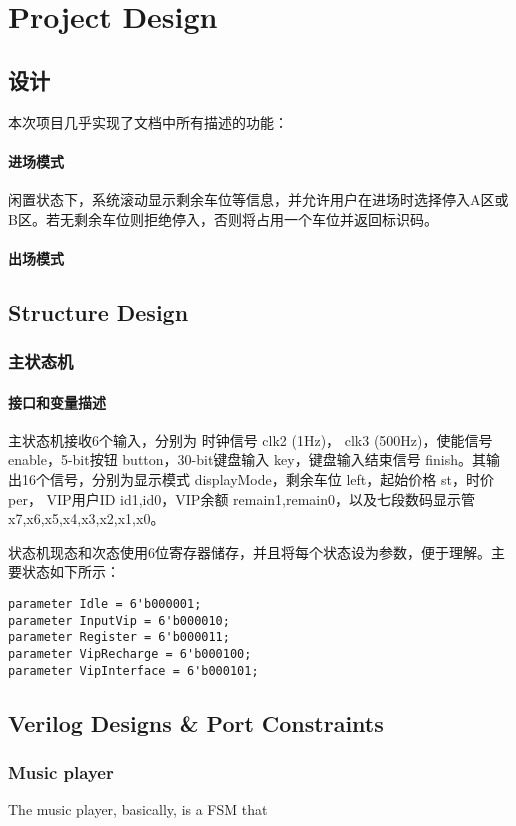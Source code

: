 \section{Project Design}

\subsection{设计}
本次项目几乎实现了文档中所有描述的功能：
\vspace{-1.3em}
\paragraph{ 进场模式} 闲置状态下，系统滚动显示剩余车位等信息，并允许用户在进场时选择停入A区或B区。若无剩余车位则拒绝停入，否则将占用一个车位并返回标识码。
\paragraph{ 出场模式} 

\subsection{Structure Design}

\subsubsection{主状态机}
\paragraph{接口和变量描述} 主状态机接收6个输入，分别为 时钟信号 clk2 (1Hz)， clk3 (500Hz)，使能信号 enable，5-bit按钮 button，30-bit键盘输入 key，键盘输入结束信号 finish。其输出16个信号，分别为显示模式 displayMode，剩余车位 left，起始价格 st，时价 per， VIP用户ID {id1,id0}，VIP余额 {remain1,remain0}，以及七段数码显示管 {x7,x6,x5,x4,x3,x2,x1,x0}。
\par 状态机现态和次态使用6位寄存器储存，并且将每个状态设为参数，便于理解。主要状态如下所示：
\begin{lstlisting}
parameter Idle = 6'b000001;
parameter InputVip = 6'b000010;
parameter Register = 6'b000011;
parameter VipRecharge = 6'b000100;
parameter VipInterface = 6'b000101;
\end{lstlisting}



\subsection{Verilog Designs \& Port Constraints}

\subsubsection{Music player}

The music player, basically, is a FSM that 